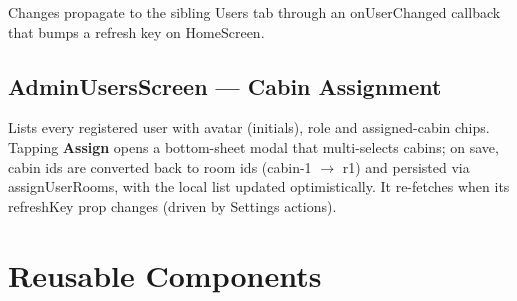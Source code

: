 \documentclass[11pt,a4paper]{article}
\newcommand{\code}[1]{\colorbox{codebg}{\ttfamily\small #1}}
\begin{document}
Changes propagate to the sibling Users tab through an \code{onUserChanged}
callback that bumps a refresh key on \code{HomeScreen}.

\subsection{AdminUsersScreen — Cabin Assignment}

Lists every registered user with avatar (initials), role and assigned-cabin
chips. Tapping \textbf{Assign} opens a bottom-sheet modal that multi-selects
cabins; on save, cabin ids are converted back to room ids
(\code{cabin-1} $\rightarrow$ \code{r1}) and persisted via
\code{assignUserRooms}, with the local list updated optimistically. It re-fetches
when its \code{refreshKey} prop changes (driven by Settings actions).

\section{Reusable Components}
\end{document}
